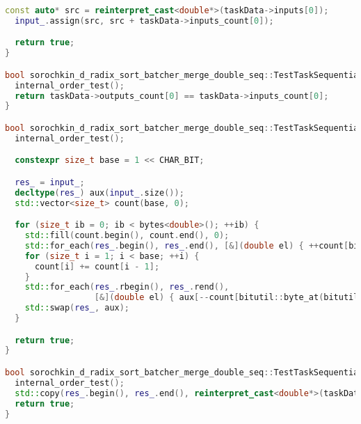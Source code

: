 \documentclass[12pt]{article}
\begin{document}
\begin{lstlisting}[language=C++, caption={Код алгоритма}]
  const auto* src = reinterpret_cast<double*>(taskData->inputs[0]);
  input_.assign(src, src + taskData->inputs_count[0]);

  return true;
}

bool sorochkin_d_radix_sort_batcher_merge_double_seq::TestTaskSequential::validation() {
  internal_order_test();
  return taskData->outputs_count[0] == taskData->inputs_count[0];
}

bool sorochkin_d_radix_sort_batcher_merge_double_seq::TestTaskSequential::run() {
  internal_order_test();

  constexpr size_t base = 1 << CHAR_BIT;

  res_ = input_;
  decltype(res_) aux(input_.size());
  std::vector<size_t> count(base, 0);

  for (size_t ib = 0; ib < bytes<double>(); ++ib) {
    std::fill(count.begin(), count.end(), 0);
    std::for_each(res_.begin(), res_.end(), [&](double el) { ++count[bitutil::byte_at(bitutil::as_uint64(el), ib)]; });
    for (size_t i = 1; i < base; ++i) {
      count[i] += count[i - 1];
    }
    std::for_each(res_.rbegin(), res_.rend(),
                  [&](double el) { aux[--count[bitutil::byte_at(bitutil::as_uint64(el), ib)]] = el; });
    std::swap(res_, aux);
  }

  return true;
}

bool sorochkin_d_radix_sort_batcher_merge_double_seq::TestTaskSequential::post_processing() {
  internal_order_test();
  std::copy(res_.begin(), res_.end(), reinterpret_cast<double*>(taskData->outputs[0]));
  return true;
}
\end{lstlisting}
\end{document}
